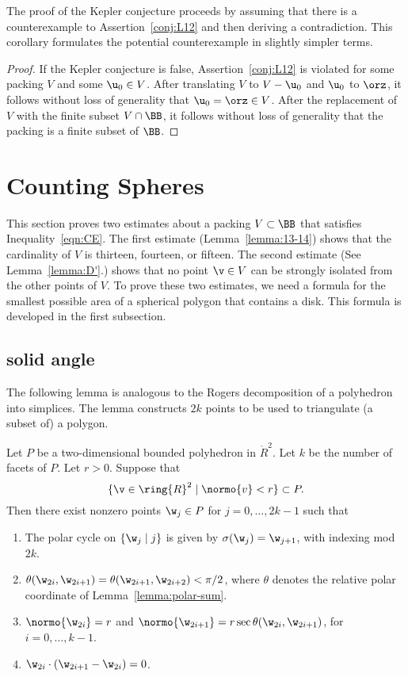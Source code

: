 The proof of the Kepler conjecture proceeds by assuming that there is
a counterexample to Assertion~\ref{conj:L12} and then deriving a
contradiction.  This corollary formulates the potential counterexample
in slightly simpler terms.

\begin{proof} If the Kepler conjecture is false,
  Assertion~\ref{conj:L12} is violated for some packing $ V$ and some
  $ \u_0\in V$.  After translating  $ V$ to $ V - \u_0$ and $
  \u_0$ to $\orz$, it follows without loss of generality that $
  \u_0=\orz\in V$.  After the replacement of $ V$ with the finite
  subset $V\cap \BB$, it follows without loss of generality that the
  packing is a finite subset of $\BB$.
\end{proof}



\section{Counting Spheres}

This section proves two estimates about a packing $V\subset \BB$ that
satisfies Inequality~\ref{eqn:CE}.  The first estimate
(Lemma~\ref{lemma:13-14}) shows that the cardinality of $V$ is
thirteen, fourteen, or fifteen.  The second estimate (See
Lemma~\ref{lemma:D'}.)  shows that no point $\v\in V$ can be strongly
isolated from the other points of $V$.  To prove these two estimates,
we need a formula for the smallest possible area of a spherical
polygon that contains a disk.  This formula is developed in the first
subsection.

\subsection{solid angle}
%
%

The following lemma is analogous to the Rogers decomposition of a
polyhedron into simplices.  The lemma constructs $2k$ points to be
used to triangulate (a subset of) a polygon.

\begin{lemma}[]\label{lemma:2D-poly}
Let $P$ be a two-dimensional bounded polyhedron in $\ring{R}^2$.
Let $k$ be the number of facets of $P$.  Let $r>0$.  Suppose that
\[
\{\v\in \ring{R}^2\mid  \normo{v}< r\} \subset P.
\]
Then there exist nonzero points $\w_j\in P$
for $j=0,\ldots,2 k-1$ such that
\begin{enumerate}
\item The polar cycle on  $\{\w_j\mid j\}$ is given by
$\sigma(\w_j) = \w_{j+1}$, with indexing mod $2k$.
\item $\theta(\w_{2i},\w_{2i+1}) = \theta(\w_{2i+1},\w_{2i+2}) < \pi/2$,  
where $\theta$ denotes the
relative polar coordinate of Lemma~\ref{lemma:polar-sum}.
\item $\normo{\w_{2i}}=r$ and 
$\normo{\w_{2i+1}} = r\sec \theta(\w_{2i},\w_{2i+1})$, 
for $i=0,\ldots,k-1$.
\item $\w_{2i}\cdot (\w_{2i+1}-\w_{2i}) = 0$.
\end{enumerate}
\end{lemma}

